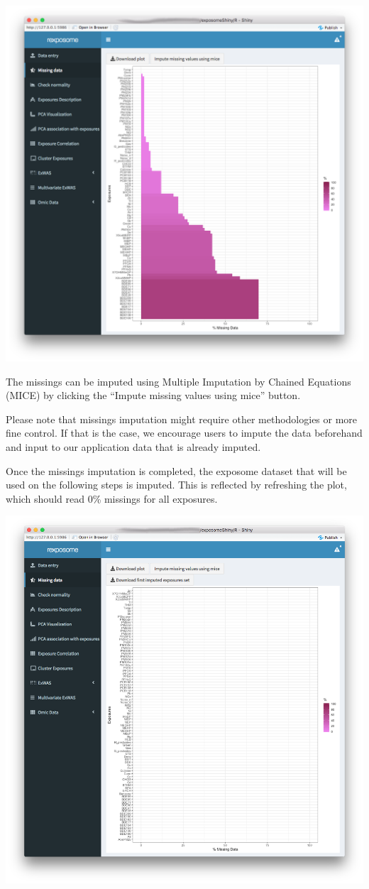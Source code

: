 \documentclass[
]{book}
\begin{document}
\includegraphics{images/analysis2_2.png}

The missings can be imputed using Multiple Imputation by Chained Equations (MICE) by clicking the ``Impute missing values using mice'' button.

Please note that missings imputation might require other methodologies or more fine control. If that is the case, we encourage users to impute the data beforehand and input to our application data that is already imputed.

Once the missings imputation is completed, the exposome dataset that will be used on the following steps is imputed. This is reflected by refreshing the plot, which should read 0\% missings for all exposures.

\includegraphics{images/analysis2_3.png}
\end{document}
